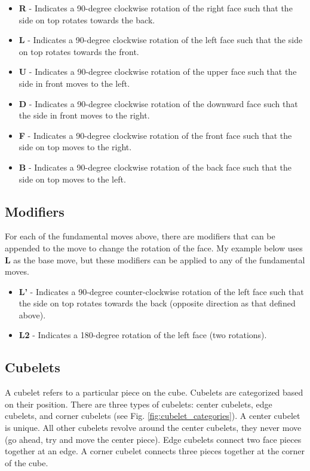 \documentclass[final, letterpaper, 10 pt, conference, twocolumn]{IEEEtran}
\begin{document}
\begin{itemize}

\item{\textbf{R}} - Indicates a 90-degree clockwise rotation of the right face such that the side on top rotates towards the back.
\item{\textbf{L}} - Indicates a 90-degree clockwise rotation of the left face such that the side on top rotates towards the front.
\item{\textbf{U}} - Indicates a 90-degree clockwise rotation of the upper face such that the side in front moves to the left.
\item{\textbf{D}} - Indicates a 90-degree clockwise rotation of the downward face such that the side in front moves to the right.
\item{\textbf{F}} - Indicates a 90-degree clockwise rotation of the front face such that the side on top moves to the right.
\item{\textbf{B}} - Indicates a 90-degree clockwise rotation of the back face such that the side on top moves to the left.
\end{itemize}

\subsection{Modifiers}
For each of the fundamental moves above, there are modifiers that can be appended to the move to change the rotation of the face. My example below uses \textbf{L} as the base move, but these modifiers can be applied to any of the fundamental moves.

\begin{itemize}
\item \textbf{L'} - Indicates a 90-degree counter-clockwise rotation of the left face such that the side on top rotates towards the back (opposite direction as that defined above).
\item \textbf{L2} - Indicates a 180-degree rotation of the left face (two rotations).
\end{itemize}

\subsection{Cubelets}
A cubelet refers to a particular piece on the cube. Cubelets are categorized based on their position. There are three types of cubelets: center cubelets, edge cubelets, and corner cubelets (see Fig. \ref{fig:cubelet_categories}). A center cubelet is unique. All other cubelets revolve around the center cubelets, they never move (go ahead, try and move the center piece). Edge cubelets connect two face pieces together at an edge. A corner cubelet connects three pieces together at the corner of the cube.
\end{document}
